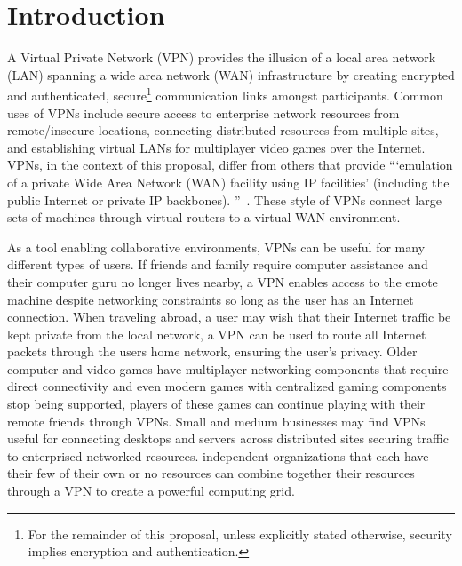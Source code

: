 \chapter{Introduction}
\label{introduction}
A Virtual Private Network (VPN) provides the illusion of a local area network
(LAN) spanning a wide area network (WAN) infrastructure by creating encrypted
and authenticated, secure\footnote{For the remainder of this proposal, unless
explicitly stated otherwise, security implies encryption and authentication.}
communication links amongst participants.  Common uses of VPNs include secure
access to enterprise network resources from remote/insecure locations,
connecting distributed resources from multiple sites, and establishing virtual
LANs for multiplayer video games over the Internet.  VPNs, in the context of
this proposal, differ from others that provide ```emulation of a private Wide
Area Network (WAN) facility using IP facilities' (including the public Internet
or private IP backbones).  ''~\cite{ip_vpns}.  These style of VPNs connect large
sets of machines through virtual routers to a virtual WAN environment.

As a tool enabling collaborative environments, VPNs can be useful for many
different types of users.  If friends and family require computer assistance
and their computer guru no longer lives nearby, a VPN enables access to the
emote machine despite networking constraints so long as the user has an
Internet connection.  When traveling abroad, a user may wish that their
Internet traffic be kept private from the local network, a VPN can be
used to route all Internet packets through the users home network, ensuring
the user's privacy.  Older computer and video games have multiplayer networking
components that require direct connectivity and even modern games with
centralized gaming components stop being supported, players of these games
can continue playing with their remote friends through VPNs.  Small and medium
businesses may find VPNs useful for connecting desktops and servers across
distributed sites securing traffic to enterprised networked resources.
independent organizations that each have their few of their own or no resources
can combine together their resources through a VPN to create a powerful
computing grid.

